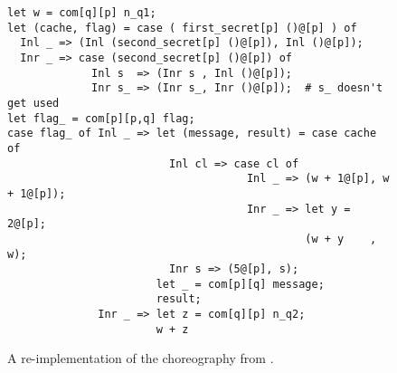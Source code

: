 \begin{figure}[tbhp]
    \begin{mdframed}
    \begin{verbatim}
let w = com[q][p] n_q1;
let (cache, flag) = case ( first_secret[p] ()@[p] ) of
  Inl _ => (Inl (second_secret[p] ()@[p]), Inl ()@[p]);
  Inr _ => case (second_secret[p] ()@[p]) of
             Inl s  => (Inr s , Inl ()@[p]);
             Inr s_ => (Inr s_, Inr ()@[p]);  # s_ doesn't get used
let flag_ = com[p][p,q] flag;
case flag_ of Inl _ => let (message, result) = case cache of
                         Inl cl => case cl of
                                     Inl _ => (w + 1@[p], w + 1@[p]);
                                     Inr _ => let y = 2@[p];
                                              (w + y    , w);
                         Inr s => (5@[p], s);
                       let _ = com[p][q] message;
                       result;
              Inr _ => let z = com[q][p] n_q2;
                       w + z
    \end{verbatim}
        \caption{A \HLSCentral re-implementation of the choreography from .}
    \label{fig:our-complex-human}
    \end{mdframed}
\end{figure}




